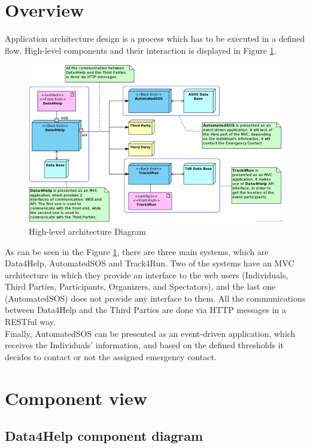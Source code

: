 \documentclass[a4paper, hidelinks, 12pt]{report}
\begin{document}
	\section{Overview}
	Application architecture design is a process which has to be executed in a defined flow. High-level components and their interaction is displayed in Figure \ref{fig:High-level architecture Diagram}.
	\begin{figure}[H]
		\centering
		\includegraphics[width=1\textwidth]{diagrams/architecture.png}
		\caption[High-level architecture Diagram]{High-level architecture Diagram}
		\label{fig:High-level architecture Diagram}
	\end{figure}
	
	As can be seen in the Figure \ref{fig:High-level architecture Diagram}, there are three main systems, which are Data4Help, AutomatedSOS and Track4Run. Two of the systems have an MVC architecture in which they provide an interface to the web users (Individuals, Third Parties, Participants, Organizers, and Spectators), and the last one (AutomatedSOS) does not provide any interface to them. All the communications between Data4Help and the Third Parties are done via HTTP messages in a RESTful way. \\
	
	Finally, AutomatedSOS can be presented as an event-driven application, which receives the Individuals' information, and based on the defined thresholds it decides to contact or not the assigned emergency contact.

	\section{Component view}
		\subsection{Data4Help component diagram}
\end{document}
